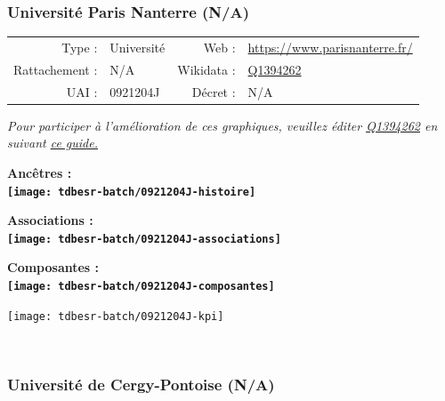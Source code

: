 \documentclass[12pt,french,]{article}
\begin{document}
\hypertarget{universituxe9-paris-nanterre-na}{%
\subsubsection{Université Paris Nanterre
(N/A)}\label{universituxe9-paris-nanterre-na}}

\begin{tabular*}{\textwidth}{rp{5cm}rl}  
\hline  
Type : & Université & Web : &\href{https://www.parisnanterre.fr/}{https://www.parisnanterre.fr/} \\  
Rattachement : & N/A & Wikidata : & \href{https://www.wikidata.org/entity/Q1394262}{Q1394262} \\  
UAI : & 0921204J & Décret : & N/A \\  
\hline  
\end{tabular*}

\textit{\scriptsize Pour participer à l'amélioration de ces graphiques, veuillez éditer  \href{https://www.wikidata.org/entity/Q1394262}{Q1394262}  en suivant \href{https://github.com/cpesr/wikidataESR/blob/master/Rmd/wikidataESR.md}{ce guide.}}

\vspace{1cm}  
\begin{minipage}[b]{0.50\textwidth}\begin{center} \bf Ancêtres : \\  
\texttt{[image: tdbesr-batch/0921204J-histoire]} \end{center}\end{minipage}\begin{minipage}[b]{0.50\textwidth}\begin{center} \bf Associations : \\  
\texttt{[image: tdbesr-batch/0921204J-associations]} \end{center}\end{minipage}

\hrulefill

\begin{center} \bf Composantes : \\  
\texttt{[image: tdbesr-batch/0921204J-composantes]} \end{center}

\begin{center}\texttt{[image: tdbesr-batch/0921204J-kpi]} \end{center}\checkoddpage

\ifoddpage ~\newpage \fi   

\hypertarget{universituxe9-de-cergy-pontoise-na}{%
\subsubsection{Université de Cergy-Pontoise
(N/A)}\label{universituxe9-de-cergy-pontoise-na}}
\end{document}
